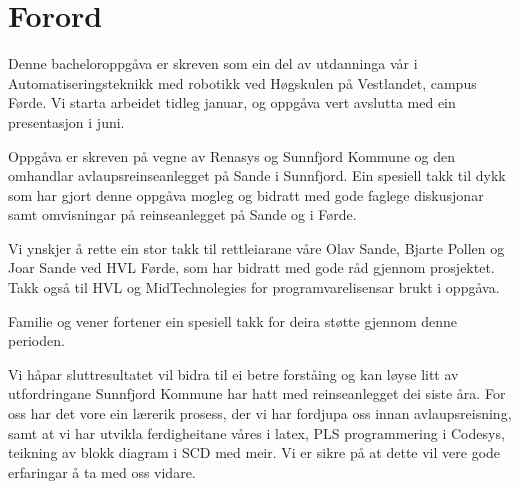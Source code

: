 \chapter{Forord}
\thispagestyle{romanpages}

Denne bacheloroppgåva er skreven som ein del av utdanninga vår i Automatiseringsteknikk med robotikk ved Høgskulen på Vestlandet, campus Førde.
Vi starta arbeidet tidleg januar, og oppgåva vert avslutta med ein presentasjon i juni.

Oppgåva er skreven på vegne av \gls{Renasys}\citep{Renasys} og \gls{Sunnfjord Kommune}\citep{SunnfjordKommune} og den omhandlar 
avlaupsreinseanlegget på Sande i Sunnfjord. 
Ein spesiell takk til dykk som har gjort denne oppgåva mogleg og
bidratt med gode faglege diskusjonar samt omvisningar på reinseanlegget på Sande og i Førde.

Vi ynskjer å rette ein stor takk til rettleiarane våre Olav Sande, Bjarte Pollen og Joar Sande ved \gls{HVL} Førde, som har bidratt med gode råd gjennom prosjektet.
Takk også til \gls{HVL} og MidTechnolegies\citep{MIDT} for programvarelisensar brukt i oppgåva.

Familie og vener fortener ein spesiell takk for deira støtte gjennom denne perioden.

Vi håpar sluttresultatet vil bidra til ei betre forståing og kan løyse litt av utfordringane \gls{Sunnfjord Kommune} har hatt med reinseanlegget dei siste åra.
For oss har det vore ein lærerik prosess, der vi har fordjupa oss innan avlaupsreisning, samt at vi har utvikla ferdigheitane våres i \gls{latex}, 
\gls{PLS} programmering i \gls{Codesys}, teikning av blokk diagram i \gls{SCD} med meir. Vi er sikre på at dette vil vere gode erfaringar å ta med oss vidare.
